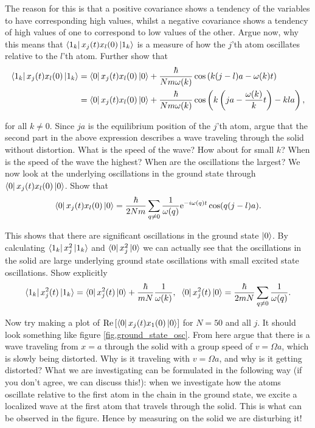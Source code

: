 \documentclass[10pt]{article}
\def\te{{\rm e}}
\begin{document}
The reason for this is that a positive covariance shows a tendency of the variables to have corresponding high values, whilst a negative covariance shows a tendency of high values of one to correspond to low values of the other. Argue now, why this means that $\bra{1_k} x_j(t)x_l(0)\ket{1_k}$ is a measure of how the $j$'th atom oscillates relative to the $l$'th atom. Further show that
\begin{align}
\bra{1_k} x_j(t)x_l(0)\ket{1_k} &= \bra{0} x_j(t)x_l(0)\ket{0} + \frac{\hbar}{Nm\omega(k)}\cos\left(k(j-l)a-\omega(k)t\right) \\
&=  \bra{0} x_j(t)x_l(0)\ket{0} + \frac{\hbar}{Nm\omega(k)}\cos\left(k\left(ja-\frac{\omega(k)}{k}t\right)-kla\right),
\end{align}

for all $k\neq 0$. Since $ja$ is the equilibrium position of the $j$'th atom, argue that the second part in the above expression describes a wave traveling through the solid without distortion. What is the speed of the wave? How about for small $k$? When is the speed of the wave the highest? When are the oscillations the largest? We now look at the underlying oscillations in the ground state through $\bra{0} x_j(t)x_l(0)\ket{0}$. Show that
\begin{equation}
\bra{0} x_j(t)x_l(0)\ket{0} = \frac{\hbar}{2Nm}\sum_{q \neq 0} \frac{1}{\omega(q)}\te^{-i\omega(q)t}\cos(q(j-l)a).
\label{eq.ground_state_osc}
\end{equation}

This shows that there are significant oscillations in the ground state $\ket{0}$. By calculating $\bra{1_k}x_j^2\ket{1_k}$ and $\bra{0}x_j^2\ket{0}$ we can actually see that the oscillations in the solid are large underlying ground state oscillations with small excited state oscillations. Show explicitly
\begin{equation}
\bra{1_k}x_j^2(t)\ket{1_k} = \bra{0}x_j^2(t)\ket{0} + \frac{\hbar}{mN}\frac{1}{\omega(k)}, \; \;  \bra{0}x_j^2(t)\ket{0} = \frac{\hbar}{2mN}\sum_{q\neq 0} \frac{1}{\omega(q)}. 
\end{equation}

Now try making a plot of $\text{Re}\left[\bra{0} x_j(t)x_1(0)\ket{0}\right]$ for $N = 50$ and all $j$. It should look something like figure \ref{fig.ground_state_osc}. From here argue that there is a wave traveling from $x=a$ through the solid with a group speed of $v=\Omega a$, which is slowly being distorted. Why is it traveling with $v=\Omega a$, and why is it getting distorted? What we are investigating can be formulated in the following way (if you don't agree, we can discuss this!): when we investigate how the atoms oscillate relative to the first atom in the chain in the ground state, we excite a localized wave at the first atom that travels through the solid. This is what can be observed in the figure. Hence by measuring on the solid we are disturbing it! 
\end{document}
